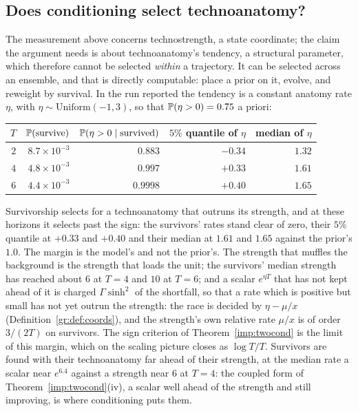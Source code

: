 \subsection{Does conditioning select technoanatomy?}
\label{gr:subsub:anatsel}

The measurement above concerns technostrength, a state coordinate; the
claim the argument needs is about technoanatomy's tendency, a structural parameter,
which therefore cannot be selected \emph{within} a trajectory. It can be
selected across an ensemble, and that is directly computable: place a
prior on it, evolve, and reweight by survival. In the run reported the
tendency is a constant anatomy rate $\eta$, with
$\eta\sim\mathrm{Uniform}(-1,3)$, so that $\mathbb{P}(\eta>0)=0.75$ a priori:

\begin{center}\small
\begin{tabular}{@{}rrrrr@{}}
\toprule
$T$ & $\mathbb{P}(\text{survive})$ & $\mathbb{P}(\eta>0\mid\text{survived})$ &
$5\%$ quantile of $\eta$ & median of $\eta$\\
\midrule
$2$ & $8.7\times10^{-3}$ & $0.883$ & $-0.34$ & $1.32$\\
$4$ & $4.8\times10^{-3}$ & $0.997$ & $+0.33$ & $1.61$\\
$6$ & $4.4\times10^{-3}$ & $0.9998$ & $+0.40$ & $1.65$\\
\bottomrule
\end{tabular}
\end{center}

\noindent Survivorship selects for a technoanatomy that outruns its
strength, and at these horizons it selects past the sign: the survivors'
rates stand clear of zero, their $5\%$ quantile at $+0.33$ and $+0.40$ and
their median at $1.61$ and $1.65$ against the prior's $1.0$. The margin is
the model's and not the prior's. The strength that muffles the background
is the strength that loads the unit; the survivors' median strength has
reached about $6$ at $T=4$ and $10$ at $T=6$; and a scalar $e^{\eta T}$
that has not kept ahead of it is charged $\Gamma\sinh^2$ of the shortfall,
so that a rate which is positive but small has not yet outrun the
strength: the race is decided by $\eta-\mu/x$
(Definition~\ref{gr:def:coords}), and the strength's own relative rate
$\mu/x$ is of order $3/(2T)$ on survivors. The sign criterion of
Theorem~\ref{imp:twocond} is the limit of this margin, which on the
scaling picture closes as $\log T/T$. Survivors
are found with their technoanatomy far ahead of their strength, at the
median rate a scalar near $e^{6.4}$ against a strength near $6$ at $T=4$:
the coupled form of Theorem~\ref{imp:twocond}(iv), a scalar well ahead of
the strength and still improving, is where conditioning puts them.

